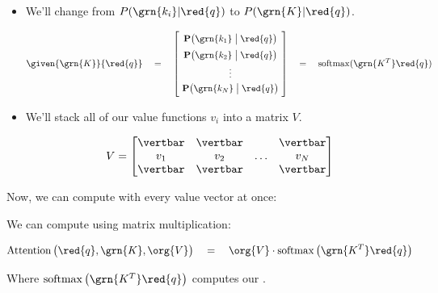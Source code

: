        \begin{itemize}
            \item We'll change from $P(\grn{k_i}|\red{q})$ to $P(\grn{K}|\red{q})$.
        

            \begin{equation*}
                \given{ \grn{K} }{ \red{q} }  \quad=\quad
                \begin{bmatrix}
                    \phantom{\Big|} 
                    \mathbf{P} \big( \grn{k_1} \;\big|\; \red{q} \big) \phantom{\Big|} \\
                    \phantom{\Big|}
                    \mathbf{P} \big( \grn{k_2} \;\big|\; \red{q} \big) 
                    \phantom{\Big|}\\
                    \vdots \\
                    \phantom{\Big|}
                    \mathbf{P} \big( \grn{k_N} \;\big|\; \red{q} \big) 
                    \phantom{\Big|}\\
                \end{bmatrix}
                \quad=\quad
                \operatorname{softmax}( \grn{K^T}\red{q})
            \end{equation*}

            \item We'll stack all of our value functions $v_i$ into a matrix $V$.

            \begin{equation}
                V = 
                \begin{bmatrix}
                    \vertbar & \vertbar  & \     & \vertbar \\
                    v_1 & v_2 & \ldots & v_N \\
                    \vertbar & \vertbar  &        & \vertbar
                \end{bmatrix}
            \end{equation}
        \end{itemize}

        Now, we can compute with every value vector at once:\\

        \begin{kequation}
            We can compute  using matrix multiplication:

            \begin{equation*}
                \operatorname{Attention} \big( \red{q},\grn{K},\org{V} \big) 
                \quad=\quad 
                \org{V} \cdot \operatorname{softmax} \big( \grn{K^T}\red{q} \big)
            \end{equation*}

            Where $\operatorname{softmax} \big( \grn{K^T}\red{q} \big)$ computes our .
        \end{kequation}

